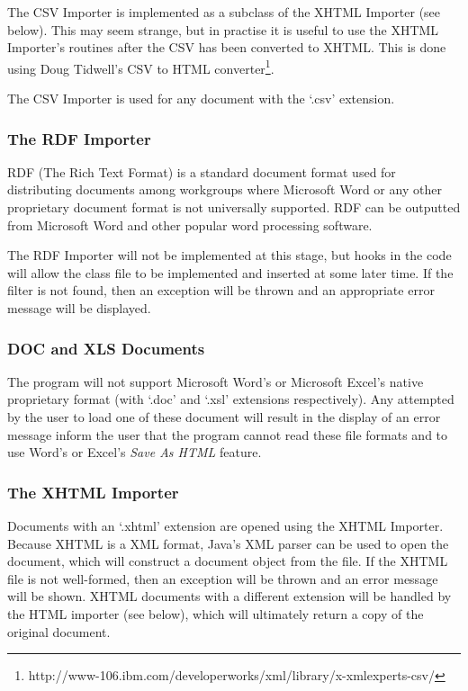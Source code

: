 The CSV Importer is implemented as a subclass of the XHTML Importer (see
below). This may seem strange, but in practise it is useful to use the XHTML
Importer's routines after the CSV has been converted to XHTML. This is done using
Doug Tidwell's CSV to HTML
converter\footnote{http://www-106.ibm.com/developerworks/xml/library/x-xmlexperts-csv/}.

The CSV Importer is used for any document with the `.csv' extension.

\subsubsection{The RDF Importer}

RDF (The Rich Text Format) is a standard document format used for distributing
documents among workgroups where Microsoft Word or any other proprietary
document format is not universally supported. RDF can be outputted from
Microsoft Word and other popular word processing software.

The RDF Importer will not be implemented at this stage, but hooks in the code
will allow the class file to be implemented and inserted at some later time. If
the filter is not found, then an exception will be thrown and an appropriate
error message will be displayed.

\subsubsection{DOC and XLS Documents}

The program will not support Microsoft Word's or Microsoft Excel's native
proprietary format (with `.doc' and `.xsl' extensions respectively). Any
attempted by the user to load one of these document will result in the display
of an error message inform the user that the program cannot read these file
formats and to use Word's or Excel's \emph{Save As HTML} feature.

\subsubsection{The XHTML Importer}

Documents with an `.xhtml' extension are opened using the XHTML Importer.
Because XHTML is a XML format, Java's XML parser can be used to open the
document, which will construct a document object from the file. If the XHTML
file is not well-formed, then an exception will be thrown and an error message
will be shown. XHTML documents with a different extension will be handled by
the HTML importer (see below), which will ultimately return a copy of the
original document.


